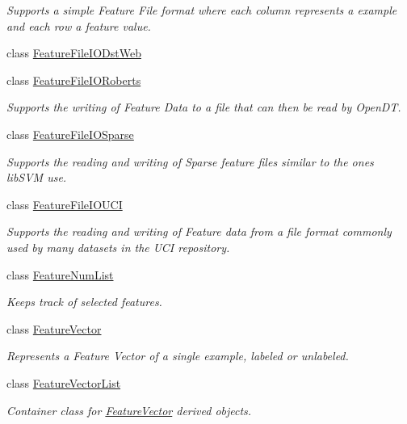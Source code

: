 \begin{DoxyCompactItemize}
\begin{DoxyCompactList}\small\item\em Supports a simple Feature File format where each column represents a example and each row a feature value. \end{DoxyCompactList}\item 
class \hyperlink{class_k_k_m_l_l_1_1_feature_file_i_o_dst_web}{Feature\+File\+I\+O\+Dst\+Web}
\item 
class \hyperlink{class_k_k_m_l_l_1_1_feature_file_i_o_roberts}{Feature\+File\+I\+O\+Roberts}
\begin{DoxyCompactList}\small\item\em Supports the writing of Feature Data to a file that can then be read by Open\+DT. \end{DoxyCompactList}\item 
class \hyperlink{class_k_k_m_l_l_1_1_feature_file_i_o_sparse}{Feature\+File\+I\+O\+Sparse}
\begin{DoxyCompactList}\small\item\em Supports the reading and writing of Sparse feature files similar to the ones lib\+S\+VM use. \end{DoxyCompactList}\item 
class \hyperlink{class_k_k_m_l_l_1_1_feature_file_i_o_u_c_i}{Feature\+File\+I\+O\+U\+CI}
\begin{DoxyCompactList}\small\item\em Supports the reading and writing of Feature data from a file format commonly used by many dataset\textquotesingle{}s in the U\+CI repository. \end{DoxyCompactList}\item 
class \hyperlink{class_k_k_m_l_l_1_1_feature_num_list}{Feature\+Num\+List}
\begin{DoxyCompactList}\small\item\em Keeps track of selected features. \end{DoxyCompactList}\item 
class \hyperlink{class_k_k_m_l_l_1_1_feature_vector}{Feature\+Vector}
\begin{DoxyCompactList}\small\item\em Represents a Feature Vector of a single example, labeled or unlabeled. \end{DoxyCompactList}\item 
class \hyperlink{class_k_k_m_l_l_1_1_feature_vector_list}{Feature\+Vector\+List}
\begin{DoxyCompactList}\small\item\em Container class for \hyperlink{class_k_k_m_l_l_1_1_feature_vector}{Feature\+Vector} derived objects. \end{DoxyCompactList}\item 

\end{DoxyCompactItemize}
